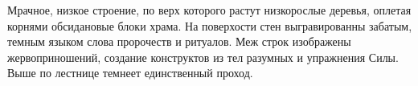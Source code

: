Мрачное, низкое строение, по верх которого растут низкорослые деревья, оплетая корнями обсидановые блоки храма. На поверхости стен выгравированны забатым, темным языком слова пророчеств и ритуалов. 
Меж строк изображены жервоприношений, создание конструктов из тел разумных и упражнения Силы. Выше по лестнице темнеет единственный проход.